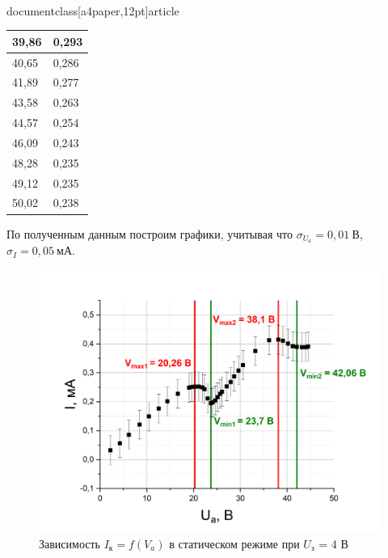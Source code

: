 \\documentclass[a4paper,12pt]{article}
\begin{document}
\begin{table}[h]
\begin{minipage}{0.3\textwidth}
\begin{tabular}{|ll|}
\multicolumn{1}{|l|}{39,86} & 0,293 \\ \hline
\multicolumn{1}{|l|}{40,65} & 0,286 \\ \hline
\multicolumn{1}{|l|}{41,89} & 0,277 \\ \hline
\multicolumn{1}{|l|}{43,58} & 0,263 \\ \hline
\multicolumn{1}{|l|}{44,57} & 0,254 \\ \hline
\multicolumn{1}{|l|}{46,09} & 0,243 \\ \hline
\multicolumn{1}{|l|}{48,28} & 0,235 \\ \hline
\multicolumn{1}{|l|}{49,12} & 0,235 \\ \hline
\multicolumn{1}{|l|}{50,02} & 0,238 \\ \hline
\end{tabular}
\end{minipage}
\end{table}	

По полученным данным построим графики, учитывая что $\sigma_{U_a} = 0,01 \ В$, $\sigma_{I} = 0,05 \ мА $.

\newpage

\begin{figure}[h!]
	\centering
	\includegraphics[scale=0.5]{graph1}
	\caption{Зависимость $I_к = f(V_a)$ в статическом режиме при $U_з$ = 4 В}
	\label{graph1}
\end{figure}
\end{document}
